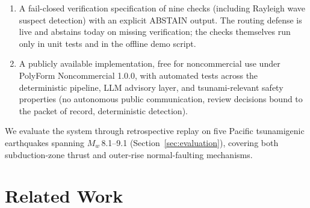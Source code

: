 \documentclass{article}
\begin{document}
\begin{enumerate}
    the ML component affects no number reported here.
  \item A fail-closed verification specification of nine checks
    (including Rayleigh wave suspect detection) with an explicit
    ABSTAIN output.  The routing defense is live and abstains today on
    missing verification; the checks themselves run only in unit tests
    and in the offline demo script.
  \item A publicly available implementation, free for noncommercial use
    under PolyForm Noncommercial 1.0.0, with automated tests
    across the deterministic pipeline, LLM advisory layer, and
    tsunami-relevant safety properties (no autonomous public
    communication, review decisions bound to the packet of record,
    deterministic detection).
\end{enumerate}

\noindent We evaluate the system through retrospective replay on five
Pacific tsunamigenic earthquakes spanning $M_w$\,8.1--9.1
(Section~\ref{sec:evaluation}), covering both subduction-zone thrust
and outer-rise normal-faulting mechanisms.


\section{Related Work}
\end{document}
